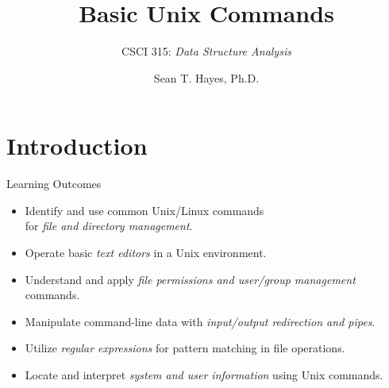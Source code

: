 \documentclass[14pt,aspectratio=1610]{beamer}
\title{\Huge{} Basic Unix Commands}
\subtitle{CSCI 315: \textit{Data Structure Analysis}}
\author{Sean T. Hayes, Ph.D.}
\institute{Charleston Southern University}
\begin{document}
\begin{frame}
  \titlepage
\end{frame}


\section{Introduction}

\begin{frame}{Learning Outcomes}
\begin{itemize}
    \item Identify and use common Unix/Linux commands \\for \emph{file and directory management}.
    \item Operate basic \emph{text editors} in a Unix environment.
    \item Understand and apply \emph{file permissions and user/group management} commands.
    \item Manipulate command-line data with \emph{input/output redirection and pipes}.
    \item Utilize \emph{regular expressions} for pattern matching in file operations.
    \item Locate and interpret \emph{system and user information} using Unix commands.
\end{itemize}
\end{frame}

\end{document}
